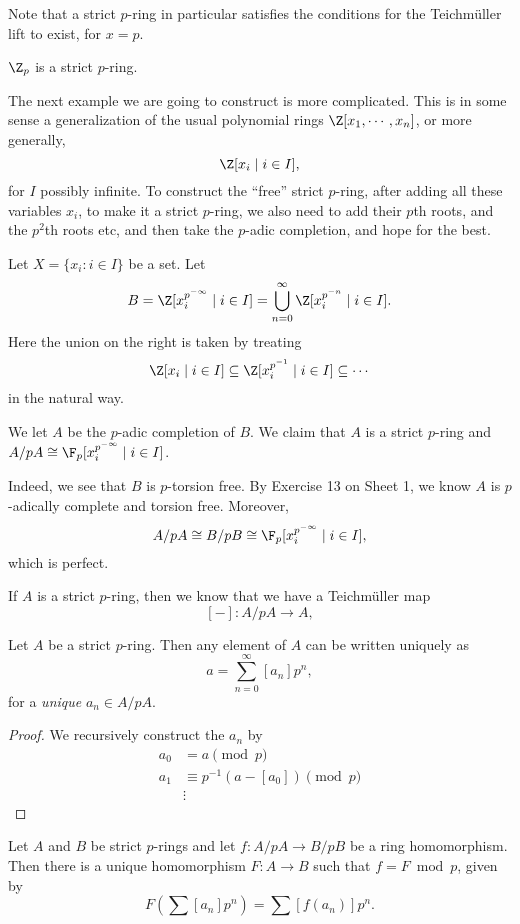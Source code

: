 \documentclass[a4paper]{article}
\begin{document}
Note that a strict $p$-ring in particular satisfies the conditions for the Teichm\"uller lift to exist, for $x = p$.
\begin{eg}
  $\Z_p$ is a strict $p$-ring.
\end{eg}

The next example we are going to construct is more complicated. This is in some sense a generalization of the usual polynomial rings $\Z[x_1, \cdots, x_n]$, or more generally,
\[
  \Z[x_i \mid i \in I],
\]
for $I$ possibly infinite. To construct the ``free'' strict $p$-ring, after adding all these variables $x_i$, to make it a strict $p$-ring, we also need to add their $p$th roots, and the $p^2$th roots etc, and then take the $p$-adic completion, and hope for the best.

\begin{eg}
  Let $X = \{x_i: i \in I\}$ be a set. Let
  \[
    B = \Z[x_i^{p^{-\infty}}\mid i \in I] = \bigcup_{n = 0}^\infty \Z[x_i^{p^{-n}}\mid i \in I].
  \]
  Here the union on the right is taken by treating
  \[
    \Z[x_i \mid i \in I] \subseteq \Z [x_i^{p^{-1}} \mid i \in I] \subseteq \cdots
  \]
  in the natural way.

  We let $A$ be the $p$-adic completion of $B$. We claim that $A$ is a strict $p$-ring and $A/pA \cong \F_p[x_i^{p^{-\infty}}\mid i \in I]$.

  Indeed, we see that $B$ is $p$-torsion free. By Exercise 13 on Sheet 1, we know $A$ is $p$-adically complete and torsion free. Moreover,
  \[
    A/pA \cong B/pB \cong \F_p[x_i^{p^{-\infty}}\mid i \in I],
  \]
  which is perfect. %
\end{eg}

If $A$ is a strict $p$-ring, then we know that we have a Teichm\"uller map
\[
  [-]: A/pA \to A,
\]
\begin{lemma}
  Let $A$ be a strict $p$-ring. Then any element of $A$ can be written uniquely as
  \[
    a = \sum_{n = 0}^\infty [a_n] p^n,
  \]
  for a \emph{unique} $a_n \in A/pA$.
\end{lemma}

\begin{proof}
  We recursively construct the $a_n$ by
  \begin{align*}
    a_0 &= a \pmod p\\
    a_1 &\equiv p^{-1}(a - [a_0]) \pmod p\\
    &\vdots
  \end{align*}
\end{proof}

\begin{lemma}
  Let $A$ and $B$ be strict $p$-rings and let $f: A/pA \to B/pB$ be a ring homomorphism. Then there is a unique homomorphism $F: A \to B$ such that $f = F \bmod p$, given by
  \[
    F\left(\sum [a_n]p^n\right) = \sum [f(a_n)] p^n.
  \]
\end{lemma}
\end{document}
